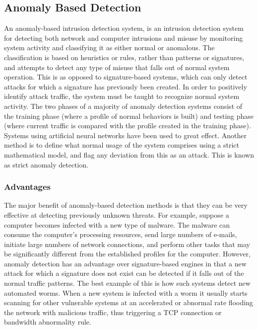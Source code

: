 \documentclass[12pt,a4paper]{report}
\begin{document}
\subsection{Anomaly Based Detection}
An anomaly-based intrusion detection system, is an intrusion detection system for detecting both network and computer intrusions and misuse by monitoring system activity and classifying it as either normal or anomalous. The classification is based on heuristics or rules, rather than patterns or signatures, and attempts to detect any type of misuse that falls out of normal system operation. This is as opposed to signature-based systems, which can only detect attacks for which a signature has previously been created.
In order to positively identify attack traffic, the system must be taught to recognize normal system activity. The two phases of a majority of anomaly detection systems consist of the training phase (where a profile of normal behaviors is built) and testing phase (where current traffic is compared with the profile created in the training phase). Systems using artificial neural networks have been used to great effect. Another method is to define what normal usage of the system comprises using a strict mathematical model, and flag any deviation from this as an attack. This is known as strict anomaly detection.
\subsubsection{Advantages}
The major benefit of anomaly-based detection methods is that they can be very effective at detecting previously unknown threats. For example, suppose a computer becomes infected with a new type of malware. The malware can consume the computer's processing resources, send large numbers of e-mails, initiate large numbers of network connections, and perform other tasks that may be significantly different from the established profiles for the computer.
However, anomaly detection has an advantage over signature-based engines in that a new attack for which a signature does not exist can be detected if it falls out of the normal traffic patterns. The best example of this is how such systems detect new automated worms. When a new system is infected with a worm it usually starts scanning for other vulnerable systems at an accelerated or abnormal rate flooding the network with malicious traffic, thus triggering a TCP connection or bandwidth abnormality rule.
\end{document}
